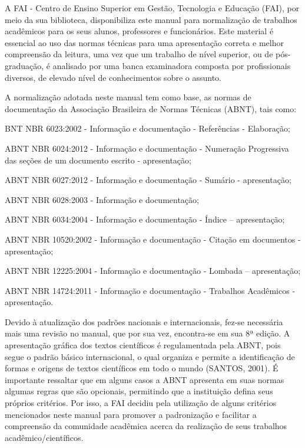 \begin{Introducao} %
A FAI - Centro de Ensino Superior em Gestão, Tecnologia e Educação (FAI), por meio da sua biblioteca, disponibiliza este manual para normalização de trabalhos acadêmicos para os seus alunos, professores e funcionários. Este material é essencial ao uso das normas técnicas para uma apresentação correta e melhor compreensão da leitura, uma vez que um trabalho de nível superior, ou de pós-graduação, é analisado por uma banca examinadora composta por profissionais diversos, de elevado nível de conhecimentos sobre o assunto.

A normalização adotada neste manual tem como base, as normas de documentação da Associação Brasileira de Normas Técnicas (ABNT), tais como:
\begin{alinea}
    \item BNT NBR 6023:2002 - Informação e documentação - Referências - Elaboração;
    \item ABNT NBR 6024:2012 - Informação e documentação - Numeração Progressiva das seções de um documento escrito - apresentação;
    \item ABNT NBR 6027:2012 - Informação e documentação - Sumário - apresentação;
    \item ABNT NBR 6028:2003 - Informação e documentação;
    \item ABNT NBR 6034:2004 - Informação e documentação - Índice – apresentação;
    \item ABNT NBR 10520:2002 - Informação e documentação - Citação em documentos - apresentação;
    \item ABNT NBR 12225:2004 - Informação e documentação - Lombada – apresentação;
    \item ABNT NBR 14724:2011 - Informação e documentação - Trabalhos Acadêmicos - apresentação.
\end{alinea}

Devido à atualização dos padrões nacionais e internacionais, fez-se necessária mais uma revisão no manual, que por sua vez, encontra-se em sua 8ª edição. A apresentação gráfica dos textos científicos é regulamentada pela ABNT, pois segue o padrão básico internacional, o qual organiza e permite a identificação de formas e origens de textos científicos em todo o mundo (SANTOS, 2001). É importante ressaltar que em alguns casos a ABNT apresenta em suas normas algumas regras que são opcionais, permitindo que a instituição defina seus próprios critérios. Por isso, a FAI decidiu pela utilização de alguns critérios mencionados neste manual para promover a padronização e facilitar a compreensão da comunidade acadêmica acerca da realização de seus trabalhos acadêmico/científicos.
\end{Introducao}





